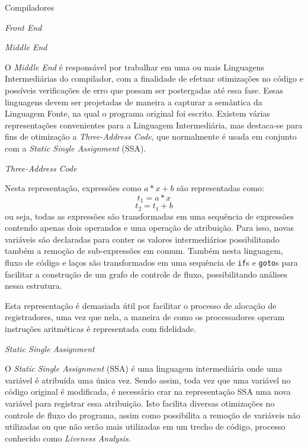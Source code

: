 \begin{section}{Compiladores}
\begin{subsection}{\textit{Front End}}
\end{subsection}

\begin{subsection}{\textit{Middle End}}

    O \textit{Middle End} é responsável por trabalhar em uma ou mais
 Linguagens Intermediárias do compilador, com a finalidade de efetuar
otimizações no código e possíveis verificações de erro que possam ser
postergadas até essa fase. Essas linguagens devem ser projetadas
de maneira a capturar a semântica da Linguagem Fonte, na qual o programa original foi
escrito.
Existem várias representações convenientes para a Linguagem Intermediária,
mas destaca-se para fins de otimização
a \textit{Three-Address Code}, que normalmente é usada em conjunto com
a \textit{Static Single Assignment} (SSA).

\begin{subsubsection}{\textit{Three-Address Code}}

Nesta representação, expressões como $a*x + b$ são
representadas como:
$$ t_1 = a*x$$
\vspace{-1cm}
$$ t_2 = t_1 + b $$
ou seja, todas as expressões são transformadas em uma sequência de expressões
contendo apenas dois operandos e uma operação de atribuição. Para isso,
novas variáveis são declaradas para conter os valores intermediários
possibilitando também a remoção de sub-expressões em comum. Também nesta
linguagem, fluxo de código e laços são transformados em uma sequência de
\texttt{if}s e \texttt{goto}s para facilitar a construção de um grafo de
controle de fluxo, possibilitando análises nessa estrutura.

Esta representação é demasiada útil por facilitar o processo de alocação
de registradores, uma vez que nela, a maneira de como os processadores
operam instruções aritméticas é representada com fidelidade\citep{lattner2002llvm}.

\end{subsubsection}
\begin{subsubsection}{\textit{Static Single Assignment}}

O \textit{Static Single Assignment} (SSA) é uma linguagem intermediária
onde uma variável é atribuída uma única vez. Sendo assim, toda vez que
uma variável no código original é modificada, é necessário crar na representação SSA uma
nova variável para registrar essa atribuição. Isto facilita diversas
otimizações no controle de fluxo do programa, assim como possibilita a remoção
de variáveis não utilizadas ou que não serão mais utilizadas em um
trecho de código, processo conhecido como \textit{Liveness Analysis}.


\end{subsubsection}
\end{subsection}
\end{section}
